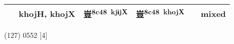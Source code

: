 \documentclass[14pt,a4paper]{scrartcl}
\begin{document}
\begin{longtable}[c]{@{}llllll@{}}
\begin{minipage}[t]{0.14\columnwidth}\raggedright\strut
𢼸
\strut\end{minipage} &
\begin{minipage}[t]{0.14\columnwidth}\raggedright\strut
khojH, khojX
\strut\end{minipage} &
\begin{minipage}[t]{0.14\columnwidth}\raggedright\strut
豈\textsuperscript{8c48~kjɨjX}
\strut\end{minipage} &
\begin{minipage}[t]{0.14\columnwidth}\raggedright\strut
豈\textsuperscript{8c48~khojX}
\strut\end{minipage} &
\begin{minipage}[t]{0.14\columnwidth}\raggedright\strut
\strut\end{minipage} &
\begin{minipage}[t]{0.14\columnwidth}\raggedright\strut
mixed
\strut\end{minipage}\tabularnewline
\bottomrule
\end{longtable}

(127) 0552 {[}4{]}
\end{document}
